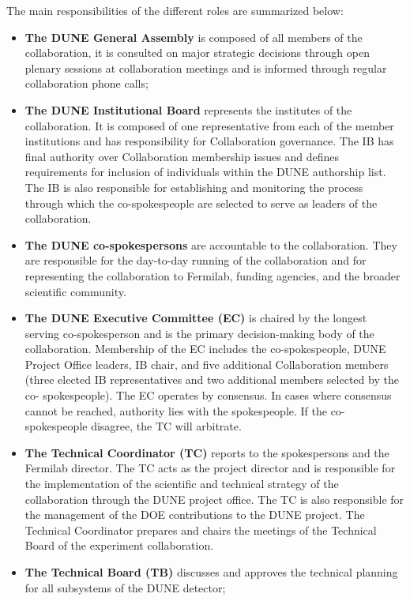 The main responsibilities of the different roles are summarized below:
\begin{itemize}
  \item \textbf{The DUNE General Assembly} is composed of all members of the collaboration, it is consulted on major strategic decisions 
    through open plenary sessions at collaboration meetings and is informed through regular collaboration phone calls;
  \item \textbf{The DUNE Institutional Board} represents the institutes of the collaboration. It is composed of one representative from each 
    of the member institutions and has responsibility for Collaboration governance.  The IB has final authority over Collaboration 
    membership issues and defines requirements for inclusion of individuals within the DUNE authorship list. The IB is also responsible    
    for establishing and monitoring the process through which the co-spokespeople are selected to serve as leaders of the collaboration.   
  \item \textbf{The DUNE co-spokespersons} are accountable to the collaboration. They 
    are responsible for the day-to-day running of the collaboration and for representing the collaboration to Fermilab, funding 
    agencies, and the broader scientific community.
  \item \textbf{The DUNE Executive Committee (EC)} is chaired by the longest serving co-spokesperson and is the primary 
    decision-making body of the collaboration. Membership of the EC includes the co-spokespeople, DUNE Project Office leaders, IB 
    chair, and five additional Collaboration members (three elected IB representatives and two additional members selected by the co-
    spokespeople). The EC operates by consensus. In cases where consensus cannot be reached, 
    authority lies with the spokespeople. If the co-spokespeople disagree, the TC will arbitrate.
  \item \textbf{The Technical Coordinator (TC)} reports to the spokespersons and the Fermilab director. 
     The TC acts as the project director 
    and is responsible for the implementation of the scientific and technical strategy of the collaboration through the DUNE project office.
    The TC is also responsible for the management of the DOE contributions to the DUNE project.  
     The Technical Coordinator prepares and chairs the meetings of the Technical Board of the experiment collaboration.
     \item \textbf{The Technical Board (TB)} discusses and approves the technical planning for all subsystems of the DUNE detector;

\end{itemize}
